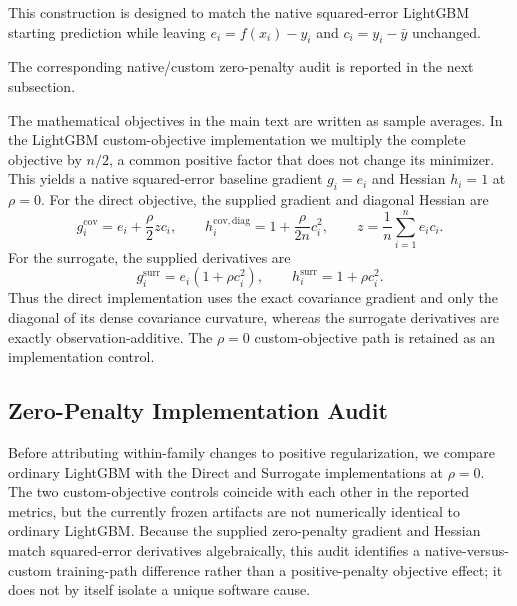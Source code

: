 \documentclass[10pt]{article}
\theoremstyle{definition}
\newcommand{\1}{\mathbf{1}}
\begin{document}
This construction is designed to match the native squared-error LightGBM starting prediction while leaving $e_i=f(x_i)-y_i$ and $c_i=y_i-\bar y$ unchanged.

The corresponding native/custom zero-penalty audit is reported in the next subsection.

The mathematical objectives in the main text are written as sample averages. In
the LightGBM custom-objective implementation we multiply the complete objective by
$n/2$, a common positive factor that does not change its minimizer. This yields a
native squared-error baseline gradient $g_i=e_i$ and Hessian $h_i=1$ at $\rho=0$.
For the direct objective, the supplied gradient and diagonal Hessian are
\[
g_i^{\mathrm{cov}}
=
e_i+\frac{\rho}{2}z c_i,
\qquad
h_i^{\mathrm{cov,diag}}
=
1+\frac{\rho}{2n}c_i^2,
\qquad
z=\frac{1}{n}\sum_{i=1}^n e_i c_i.
\]
For the surrogate, the supplied derivatives are
\[
g_i^{\mathrm{surr}}=e_i(1+\rho c_i^2),
\qquad
h_i^{\mathrm{surr}}=1+\rho c_i^2.
\]
Thus the direct implementation uses the exact covariance gradient and only the
diagonal of its dense covariance curvature, whereas the surrogate derivatives are
exactly observation-additive. The $\rho=0$ custom-objective path is retained as an
implementation control.

\subsection{Zero-Penalty Implementation Audit}
\label{subsec:zero_control_results}

Before attributing within-family changes to positive regularization, we compare ordinary LightGBM with the Direct and Surrogate implementations at $\rho=0$. The two custom-objective controls coincide with each other in the reported metrics, but the currently frozen artifacts are not numerically identical to ordinary LightGBM. Because the supplied zero-penalty gradient and Hessian match squared-error derivatives algebraically, this audit identifies a native-versus-custom training-path difference rather than a positive-penalty objective effect; it does not by itself isolate a unique software cause.
\end{document}
